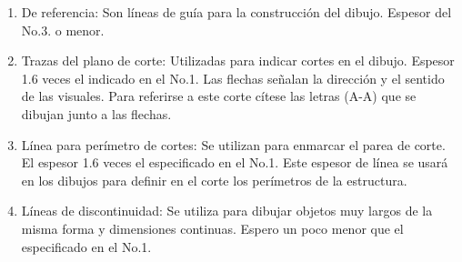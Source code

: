 \begin{enumerate}
	\item De referencia: Son líneas de guía para la construcción del dibujo. Espesor del No.3. o menor.
	      \begin{center}
	      \end{center}
	\item Trazas del plano de corte: Utilizadas para indicar cortes en el dibujo. Espesor 1.6 veces el indicado en el No.1. Las flechas señalan la dirección y el sentido de las visuales. Para referirse a este corte cítese las letras (A-A) que se dibujan junto a las flechas.
	      \begin{center}
	      \end{center}
	\item Línea para perímetro de cortes: Se utilizan para enmarcar el parea de corte. El espesor 1.6 veces el especificado en el No.1. Este espesor de línea se usará en los dibujos para definir en el corte los perímetros de la estructura.
	      \begin{center}
	      \end{center}
	\item Líneas de discontinuidad: Se utiliza para dibujar objetos muy largos de la misma forma y dimensiones continuas. Espero un poco menor que el especificado en el No.1.
	      \begin{center}
\end{center}
\end{enumerate}
